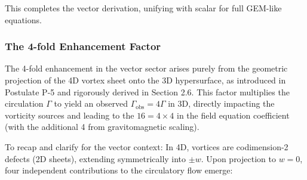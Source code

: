 This completes the vector derivation, unifying with scalar for full GEM-like equations.

\medskip
\noindent
{}
\medskip

\subsubsection{The 4-fold Enhancement Factor}

The 4-fold enhancement in the vector sector arises purely from the geometric projection of the 4D vortex sheet onto the 3D hypersurface, as introduced in Postulate P-5 and rigorously derived in Section 2.6. This factor multiplies the circulation $\Gamma$ to yield an observed $\Gamma_{\text{obs}} = 4\Gamma$ in 3D, directly impacting the vorticity sources and leading to the $16 = 4 \times 4$ in the field equation coefficient (with the additional 4 from gravitomagnetic scaling).

To recap and clarify for the vector context: In 4D, vortices are codimension-2 defects (2D sheets), extending symmetrically into $\pm w$. Upon projection to $w=0$, four independent contributions to the circulatory flow emerge:

